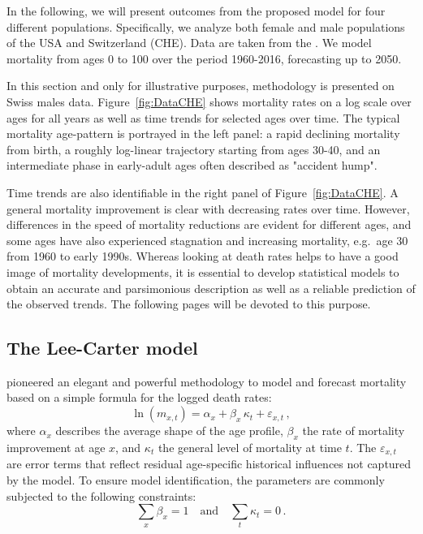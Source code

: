 \documentclass[Thesis]{subfiles}
\begin{document}
In the following, we will present outcomes from the proposed model for four different populations. Specifically, we analyze both female and male populations of the USA and Switzerland (CHE). Data are taken from the \citet{HMD}. We model mortality from ages 0 to 100 over the period 1960-2016, forecasting up to 2050.

In this section and only for illustrative purposes, methodology is presented on Swiss males data. Figure~\ref{fig:DataCHE} shows mortality rates on a log scale over ages for all years as well as time trends for selected ages over time. The typical mortality age-pattern is portrayed in the left panel: a rapid declining mortality from birth, a roughly log-linear trajectory starting from ages 30-40, and an intermediate phase in early-adult ages often described as "accident hump". 

Time trends are also identifiable in the right panel of Figure~\ref{fig:DataCHE}. A general mortality improvement is clear with decreasing rates over time. However, differences in the speed of mortality reductions are evident for different ages, and some ages have also experienced stagnation and increasing mortality, e.g.~age 30 from 1960 to early 1990s. Whereas looking at death rates helps to have a good image of mortality developments, it is essential to develop statistical models to obtain an accurate and parsimonious description as well as a reliable prediction of the observed trends. The following pages will be devoted to this purpose. 

\subsection{The Lee-Carter model}\label{Subsec:Ch6subsec2.1}

\cite{lee1992modeling} pioneered an elegant and powerful methodology to model and forecast mortality based on a simple formula for the logged death rates:
\begin{equation}\label{eq:Lee-Carter}
\ln (m_{x,t}) =\alpha_x+\beta_x \, \kappa_t + \varepsilon_{x,t} \, ,
\end{equation}
where $\alpha_x$ describes the average shape of the age profile, $\beta_x$ the rate of mortality improvement at age $x$, and $\kappa_t$ the general level of mortality at time $t$. The $\varepsilon_{x,t}$ are error terms that reflect residual age-specific historical influences not captured by the model. To ensure model identification, the parameters are commonly subjected to the following constraints:
\begin{equation}\label{eq:Lee-Carter_constr}
\sum_{x} \beta_x = 1 \quad \mathrm{and} \quad \sum_{t} \kappa_t = 0\, .
\end{equation}
\end{document}
